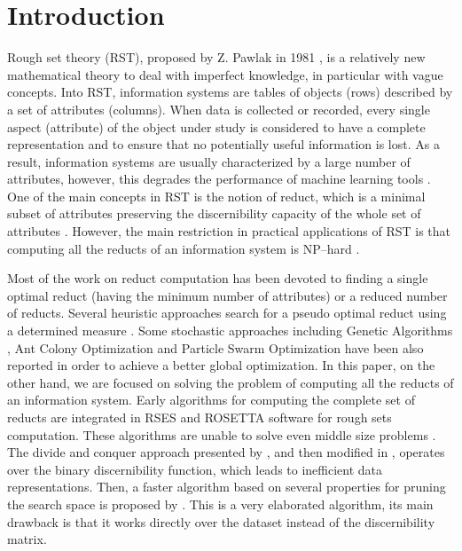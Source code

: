 \documentclass[authoryear,preprint,review,12pt]{elsarticle}
\begin{document}
\section{Introduction}
  Rough set theory (RST), proposed by Z. Pawlak in 1981 \citep{Pawlak81,Pawlak81-2,Pawlak82,Pawlak91}, 
  is a relatively new mathematical theory to deal with imperfect knowledge, in particular with vague 
  concepts. Into RST, information systems are tables of objects (rows) described by a set of attributes (columns). 
  When data is collected or recorded, every single aspect (attribute) of the object under study is considered 
  to have a complete representation and to ensure that no potentially useful information is lost.
  As a result, information systems are usually characterized by a large number of attributes,
  however, this degrades the performance of machine learning tools \citep{Parthalain08}.
  One of the main concepts in RST is the notion of reduct, which is a minimal subset of attributes 
  preserving the discernibility capacity of the whole set of attributes \citep{Pawlak91}.  
  However, the main restriction in practical applications of RST is that computing all the reducts of an 
  information system is NP--hard \citep{Skowron92}. 
  
  Most of the work on reduct computation has been devoted to finding a single optimal reduct (having the minimum 
  number of attributes) or a reduced number of reducts. Several heuristic approaches search for a pseudo optimal
  reduct using a determined measure \citep{Zheng14,Liang2014}. Some stochastic approaches including Genetic
  Algorithms \citep{Feng2012,Hedar2015}, Ant Colony Optimization \citep{Jensen03,Chebrolu2015} and Particle Swarm 
  Optimization \citep{Chen15,Luan2015} have been also reported in order to achieve a better global optimization. 
  In this paper, on the other hand, we are focused on solving the problem of computing all the reducts of an
  information system.
  Early algorithms for computing the complete set of reducts \citep{Bazan2001,Ohrn00} are integrated in RSES and
  ROSETTA software for rough sets computation. These algorithms are unable to solve even middle size problems
  \citep{Lazo15}. The divide and conquer approach presented by \cite{Starzyk99,Starzyk00}, and then modified in
  \citep{Jensen14}, operates over the binary discernibility function, which leads to inefficient data 
  representations. Then, a faster algorithm based on several properties for pruning the search space is proposed
  by \cite{WangP07}. This is a very elaborated algorithm, its main drawback is that it works directly
  over the dataset instead of the discernibility matrix. 
  
\end{document}
